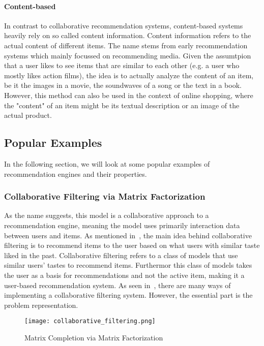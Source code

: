 \paragraph{Content-based}
In contrast to collaborative recommendation systems, content-based systems heavily rely on so called content information.
Content information refers to the actual content of different items.
The name stems from early recommendation systems which mainly focussed on recommending media.
Given the assumtpion that a user likes to see items that are similar to each other (e.g. a user who mostly likes action films), the idea is to actually analyze the content of an item, be it the images in a movie, the soundwaves of a song or the text in a book.
However, this method can also be used in the context of online shopping, where the "content" of an item might be its textual description or an image of the actual product.
\subsection{Popular Examples}
In the following section, we will look at some popular examples of recommendation engines and their properties.
\subsubsection{Collaborative Filtering via Matrix Factorization}
As the name suggests, this model is a collaborative approach to a recommendation engine, meaning the model uses primarily interaction data between users and items.
As mentioned in~\cite{intro_recsys}, the main idea behind collaborative filtering is to recommend items to the user based on what users with similar taste liked in the past.
Collaborative filtering refers to a class of models that use similar users' tastes to recommend items.
Furthermor this class of models takes the user as a basis for recommendations and not the active item, making it a user-based recommendation system.
As seen in~\cite{collaborative_filtering}, there are many ways of implementing a collaborative filtering system.
However, the essential part is the problem representation.

\begin{figure}[t]
	\centering
	\captionsetup{width=0.8\textwidth}
    \texttt{[image: collaborative\_filtering.png]}
    \caption{Matrix Completion via Matrix Factorization}
    \label{fig:collaborative_filtering}
\end{figure}

